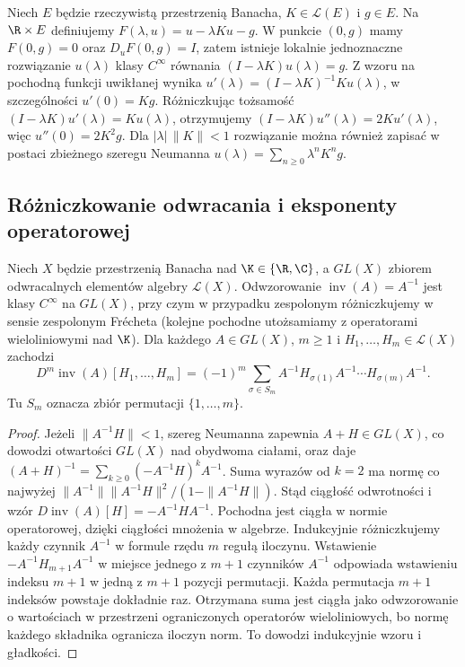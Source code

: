 \begin{przyklad}
\label{ex:implicit-operator15}
Niech $E$ będzie rzeczywistą przestrzenią Banacha, $K\in\mathcal L(E)$ i $g\in E$. Na $\R\times E$ definiujemy $F(\lambda,u)=u-\lambda Ku-g$. W punkcie $(0,g)$ mamy $F(0,g)=0$ oraz $D_uF(0,g)=I$, zatem istnieje lokalnie jednoznaczne rozwiązanie $u(\lambda)$ klasy $C^\infty$ równania $(I-\lambda K)u(\lambda)=g$. Z wzoru na pochodną funkcji uwikłanej wynika
$u'(\lambda)=(I-\lambda K)^{-1}Ku(\lambda)$, w szczególności $u'(0)=Kg$. Różniczkując tożsamość $(I-\lambda K)u'(\lambda)=Ku(\lambda)$, otrzymujemy $(I-\lambda K)u''(\lambda)=2Ku'(\lambda)$, więc $u''(0)=2K^2g$. Dla $|\lambda|\,\|K\|<1$ rozwiązanie można również zapisać w postaci zbieżnego szeregu Neumanna $u(\lambda)=\sum_{n\ge0}\lambda^nK^ng$.
\end{przyklad}


\subsection{Różniczkowanie odwracania i eksponenty operatorowej}

\begin{twierdzenie}
\label{thm:inverse-derivatives15}
Niech $X$ będzie przestrzenią Banacha nad $\K\in\{\R,\C\}$,
a $GL(X)$ zbiorem odwracalnych elementów algebry
$\mathcal L(X)$. Odwzorowanie $\operatorname{inv}(A)=A^{-1}$
jest klasy $C^\infty$ na $GL(X)$, przy czym w przypadku zespolonym różniczkujemy w sensie zespolonym Frécheta (kolejne pochodne utożsamiamy z operatorami wieloliniowymi nad $\K$). Dla każdego $A\in GL(X)$, $m\ge1$ i $H_1,\ldots,H_m\in\mathcal L(X)$ zachodzi
\[
 D^m\operatorname{inv}(A)[H_1,\ldots,H_m]
 =(-1)^m\sum_{\sigma\in S_m}
 A^{-1}H_{\sigma(1)}A^{-1}\cdots H_{\sigma(m)}A^{-1}.
\]
Tu $S_m$ oznacza zbiór permutacji $\{1,\ldots,m\}$.
\end{twierdzenie}
\begin{proof}
Jeżeli $\|A^{-1}H\|<1$, szereg Neumanna zapewnia $A+H\in GL(X)$, co dowodzi otwartości $GL(X)$ nad obydwoma ciałami, oraz daje
$(A+H)^{-1}=\sum_{k\ge0}(-A^{-1}H)^k A^{-1}$.
Suma wyrazów od $k=2$ ma normę co najwyżej
$\|A^{-1}\|\|A^{-1}H\|^2/(1-\|A^{-1}H\|)$.
Stąd ciągłość odwrotności i wzór
$D\operatorname{inv}(A)[H]=-A^{-1}HA^{-1}$.
Pochodna jest ciągła w normie operatorowej, dzięki
ciągłości mnożenia w algebrze. Indukcyjnie różniczkujemy
każdy czynnik $A^{-1}$ w formule rzędu $m$ regułą
iloczynu. Wstawienie $-A^{-1}H_{m+1}A^{-1}$ w miejsce
jednego z $m+1$ czynników $A^{-1}$ odpowiada wstawieniu
indeksu $m+1$ w jedną z $m+1$ pozycji permutacji.
Każda permutacja $m+1$ indeksów powstaje dokładnie raz.
Otrzymana suma jest ciągła jako odwzorowanie o wartościach
w przestrzeni ograniczonych operatorów wieloliniowych,
bo normę każdego składnika ogranicza iloczyn norm.
To dowodzi indukcyjnie wzoru i gładkości.
\end{proof}


